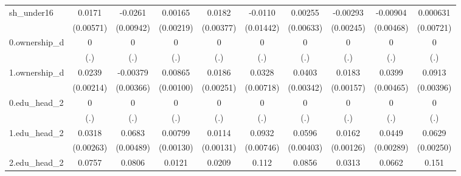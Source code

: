 \begin{table}[htbp]
\begin{tabular}{l*{9}{c}}
sh\_under16  &      0.0171\sym{***}&     -0.0261\sym{***}&     0.00165         &      0.0182\sym{***}&     -0.0110         &     0.00255         &    -0.00293         &    -0.00904\sym{*}  &    0.000631         \\
            &   (0.00571)         &   (0.00942)         &   (0.00219)         &   (0.00377)         &   (0.01442)         &   (0.00633)         &   (0.00245)         &   (0.00468)         &   (0.00721)         \\
0.ownership\_d&           0         &           0         &           0         &           0         &           0         &           0         &           0         &           0         &           0         \\
            &         (.)         &         (.)         &         (.)         &         (.)         &         (.)         &         (.)         &         (.)         &         (.)         &         (.)         \\
1.ownership\_d&      0.0239\sym{***}&    -0.00379         &     0.00865\sym{***}&      0.0186\sym{***}&      0.0328\sym{***}&      0.0403\sym{***}&      0.0183\sym{***}&      0.0399\sym{***}&      0.0913\sym{***}\\
            &   (0.00214)         &   (0.00366)         &   (0.00100)         &   (0.00251)         &   (0.00718)         &   (0.00342)         &   (0.00157)         &   (0.00465)         &   (0.00396)         \\
0.edu\_head\_2&           0         &           0         &           0         &           0         &           0         &           0         &           0         &           0         &           0         \\
            &         (.)         &         (.)         &         (.)         &         (.)         &         (.)         &         (.)         &         (.)         &         (.)         &         (.)         \\
1.edu\_head\_2&      0.0318\sym{***}&      0.0683\sym{***}&     0.00799\sym{***}&      0.0114\sym{***}&      0.0932\sym{***}&      0.0596\sym{***}&      0.0162\sym{***}&      0.0449\sym{***}&      0.0629\sym{***}\\
            &   (0.00263)         &   (0.00489)         &   (0.00130)         &   (0.00131)         &   (0.00746)         &   (0.00403)         &   (0.00126)         &   (0.00289)         &   (0.00250)         \\
2.edu\_head\_2&      0.0757\sym{***}&      0.0806\sym{***}&      0.0121\sym{***}&      0.0209\sym{***}&       0.112\sym{***}&      0.0856\sym{***}&      0.0313\sym{***}&      0.0662\sym{***}&       0.151\sym{***}\\

\end{tabular}
\end{table}
